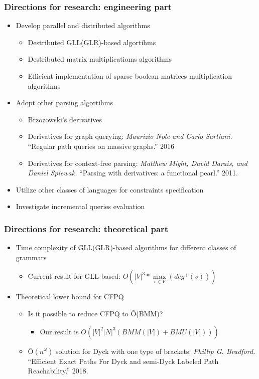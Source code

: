 \documentclass[xcolor=table]{beamer}
\begin{document}
\begin{frame} \frametitle{Directions for research: engineering part}
\begin{itemize}
\item Develop parallel and distributed algorithms
\begin{itemize}
   \item Destributed GLL(GLR)-based algortihms
   \item Destributed matrix multiplicatioms algorithms
   \item Efficient implementation of sparse boolean matrices multiplication algorithms
\end{itemize}
\item Adopt other parsing algortihms
\begin{itemize}
   \item Brzozowski’s derivatives
   \item Derivatives for graph querying: \emph{Maurizio Nole and Carlo Sartiani.} ``Regular path queries on massive graphs.'' 2016
   \item Derivatives for context-free parsing: \emph{Matthew Might, David Darais, and Daniel Spiewak.} ``Parsing with derivatives: a functional pearl.'' 2011.
\end{itemize}
\item Utilize other classes of languages for constraints specification
\item Investigate incremental queries evaluation
\end{itemize}
\end{frame}

\begin{frame} \frametitle{Directions for research: theoretical part}
\begin{itemize}
\item Time complexity of GLL(GLR)-based algorithms for different classes of grammars
\begin{itemize}
   \item Current result for GLL-based: $O\left(|V|^3*\max\limits_{v \in V}\left(deg^+\left(v\right)\right)\right)$
  \end{itemize}
\item Theoretical lower bound for CFPQ
\begin{itemize}
   \item Is it possible to reduce CFPQ to \~{O}(BMM)?
   \begin{itemize}
     \item Our result is  $O(|V|^2 |N|^3(BMM(|V|) + BMU(|V|)))$
   \end{itemize}
   \item \~{O}$(n^\omega)$ solution for Dyck with one type of brackets: \emph{Phillip G. Bradford.} ``Efficient Exact Paths For Dyck and semi-Dyck Labeled Path Reachability.'' 2018.
\end{itemize}

\end{itemize}
\end{frame}
\end{document}
